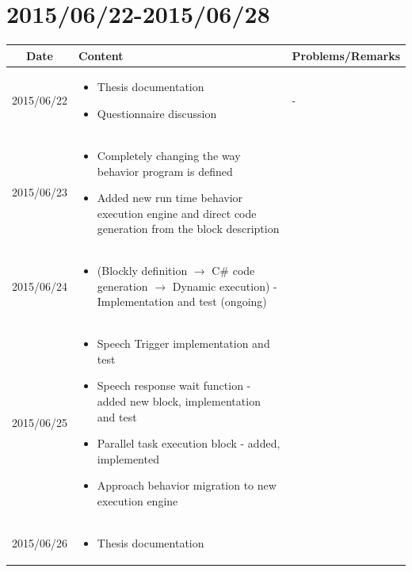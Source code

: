 \documentclass[11pt]{article} %
\begin{document}
\newpage
\section{2015/06/22-2015/06/28}

\begin{center}
    \begin{longtable}{ | c | p{6cm} | p{5cm} |}
    \hline
    Date & Content & Problems/Remarks \\ 
    \endhead
    \hline    
     2015/06/22         & 
  	\begin{itemize}
  	\item Thesis documentation
  	\item Questionnaire discussion
	\end{itemize}  
   & - \\
\hline
  										 
 2015/06/23         & 
  \begin{itemize}
  \item Completely changing the way behavior program is defined
  \item Added new run time behavior execution engine and direct code generation from the block description
\end{itemize}   
& 
 \\
\hline
  										 
  
  2015/06/24        & 
  \begin{itemize}
  \item (Blockly definition $\rightarrow$ C\# code generation $\rightarrow$ Dynamic execution) - Implementation and test (ongoing)
  \end{itemize}   
  										 & 
 
  										 \\
  \hline
  
  2015/06/25         & 
  \begin{itemize}
  \item Speech Trigger implementation and test
  \item Speech response wait function - added new block, implementation and test
  \item Parallel task execution block - added, implemented
  \item Approach behavior migration to new execution engine
  \end{itemize}
  & 
\\  										 \hline

  2015/06/26         & 
  \begin{itemize}
  \item Thesis documentation
\end{itemize}   
  & 
\\  										 \hline										 							 
  										   								 
    \end{longtable}
\end{center}
\end{document}
